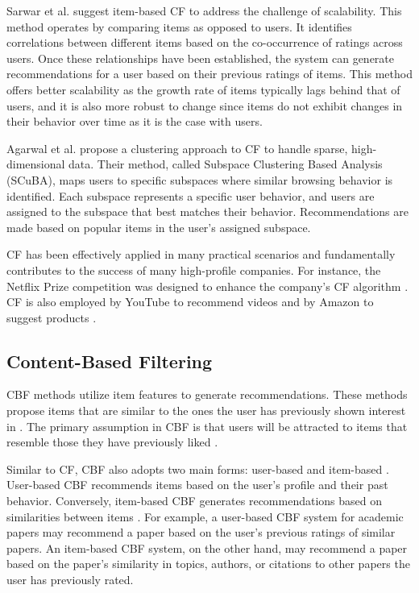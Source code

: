 Sarwar et al. \cite{SarwarItembasedCollaborative2001} suggest item-based \ac{CF} to address the challenge of scalability.
This method operates by comparing items as opposed to users. It identifies correlations between different items based on the co-occurrence of ratings across users. Once these relationships have been established, the system can generate recommendations for a user based on their previous ratings of items. This method offers better scalability as the growth rate of items typically lags behind that of users, and it is also more robust to change since items do not exhibit changes in their behavior over time as it is the case with users.

Agarwal et al. \cite{AgarwalResearchPaper2005} propose a clustering approach to \ac{CF} to handle sparse, high-dimensional data. Their method, called Subspace Clustering Based Analysis (SCuBA), maps users to specific subspaces where similar browsing behavior is identified. Each subspace represents a specific user behavior, and users are assigned to the subspace that best matches their behavior. Recommendations are made based on popular items in the user's assigned subspace.

\ac{CF} has been effectively applied in many practical scenarios and fundamentally contributes to the success of many high-profile companies.
For instance, the Netflix Prize competition was designed to enhance the company's \ac{CF} algorithm \cite{KorenMatrixFactorization2009}. \ac{CF} is also employed by YouTube to recommend videos \cite{DavidsonYouTubeVideo2010,CovingtonDeepNeural2016} and by Amazon to suggest products \cite{LindenAmazonCom2003}.


\subsection{Content-Based Filtering} \label{sec:content-based-filtering}

\acl{CBF} methods utilize item features to generate recommendations. These methods propose items that are similar to the ones the user has previously shown interest in \cite{RicciRecommenderSystems2015}. The primary assumption in \ac{CBF} is that users will be attracted to items that resemble those they have previously liked \cite{BaiScientificPaper2020}.

Similar to \ac{CF}, \ac{CBF} also adopts two main forms: user-based and item-based \cite{BurkeHybridRecommender2002}. User-based \ac{CBF} recommends items based on the user's profile and their past behavior. Conversely, item-based \ac{CBF} generates recommendations based on similarities between items \cite{PazzaniContentBasedRecommendation2007}.
For example, a user-based \ac{CBF} system for academic papers may recommend a paper based on the user's previous ratings of similar papers. An item-based \ac{CBF} system, on the other hand, may recommend a paper based on the paper's similarity in topics, authors, or citations to other papers the user has previously rated.

